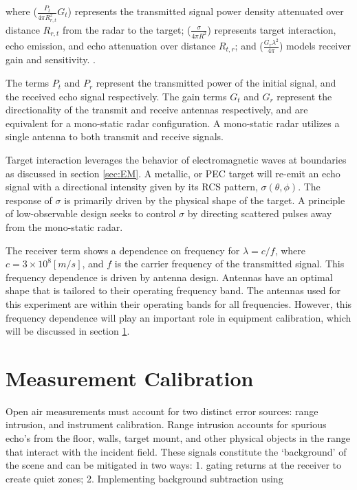 		where  ($\frac{P_t }{4 \pi R_{r, t}^2}G_t$) represents the transmitted signal power density attenuated over distance $R_{r, t}$ from the radar to the target; ($\frac{\sigma}{4 \pi R^2}$) represents target interaction, echo emission, and echo attenuation over distance $R_{t, r}$; and ($\frac{G_r \lambda^2}{4 \pi}$) models receiver gain and sensitivity. \cite{POMR_Range_eq}.

		The terms $P_t$ and $P_r$ represent the transmitted power of the initial signal, and the received echo signal respectively. The gain terms $G_t$ and $G_r$ represent the directionality of the transmit and receive antennas respectively, and are equivalent for a mono-static radar configuration. A mono-static radar utilizes a single antenna to both transmit and receive signals.

		Target interaction leverages the behavior of electromagnetic waves at boundaries as discussed in section \ref{sec:EM}. A metallic, or PEC target will re-emit an echo signal with a directional intensity given by its RCS pattern, $\sigma(\theta, \phi)$. The response of $\sigma$ is primarily driven by the physical shape of the target. A principle of low-observable design seeks to control $\sigma$ by directing scattered pulses away from the mono-static radar.

		The receiver term shows a dependence on frequency for $\lambda = c/f$, where $c = 3\times 10^8 [m/s]$, and $f$ is the carrier frequency of the transmitted signal. This frequency dependence is driven by antenna design. Antennas have an optimal shape that is tailored to their operating frequency band. The antennas used for this experiment are within their operating bands for all frequencies. However, this frequency dependence will play an important role in equipment calibration, which will be discussed in section \ref{sec:cal}.

		\section{Measurement Calibration}
	    \label{sec:cal}
	    Open air measurements must account for two distinct error sources:  range intrusion, and instrument calibration. Range intrusion accounts for spurious echo's from the floor, walls, target mount, and other physical objects in the range that interact with the incident field. These signals constitute the `background' of the scene and can be mitigated in two ways:  1. gating returns at the receiver to create quiet zones; 2. Implementing background subtraction using

